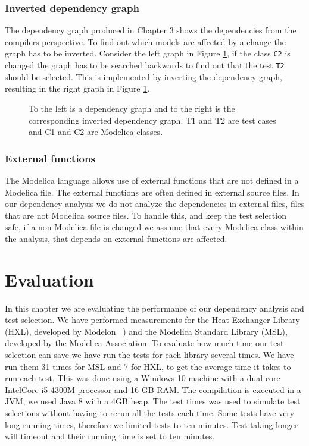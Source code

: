 \documentclass{cslthse-msc}
\begin{document}
\subsection{Inverted dependency graph}
The dependency graph produced in Chapter 3 shows the dependencies from the compilers perspective. To find out which models are affected by a change the graph has to be inverted. Consider the left graph in Figure \ref{fig:invertedGraph}, if the class \texttt{C2} is changed the graph has to be searched backwards to find out that the test \texttt{T2} should be selected. This is implemented by inverting the dependency graph, resulting in the right graph in Figure \ref{fig:invertedGraph}.

\begin{figure}[!htbp]
    \centering
    \qquad
    \caption{To the left is a dependency graph and to the right is the corresponding inverted dependency graph. T1 and T2 are test cases and C1 and C2 are Modelica classes.}
    \label{fig:invertedGraph}
\end{figure}

\subsection{External functions}
The Modelica language allows use of external functions that are not defined in a Modelica file. The external functions are often defined in external source files\cite{modelicamodelica}. In our dependency analysis we do not analyze the dependencies in external files, files that are not Modelica source files. To handle this, and keep the test selection safe, if a non Modelica file is changed we assume that every Modelica class within the analysis, that depends on external functions are affected.


\chapter[Evaluation]{Evaluation}
In this chapter we are evaluating the performance of our dependency analysis and test selection. We have performed measurements for the Heat Exchanger Library (HXL), developed by Modelon ~\cite{modelon.comHXL}) and the Modelica Standard Library (MSL), developed by the Modelica Association. To evaluate how much time our test selection can save we have run the tests for each library several times. We have run them 31 times for MSL and 7 for HXL, to get the average time it takes to run each test. This was done using a Windows 10 machine with a dual core Intel\textregistered Core \texttrademark i5-4300M processor and 16 GB RAM. The compilation is executed in a JVM, we used Java 8 with a 4GB heap. The test times was used to simulate test selections without having to rerun all the tests each time. Some tests have very long running times, therefore we limited tests to ten minutes. Test taking longer will timeout and their running time is set to ten minutes.
\end{document}
